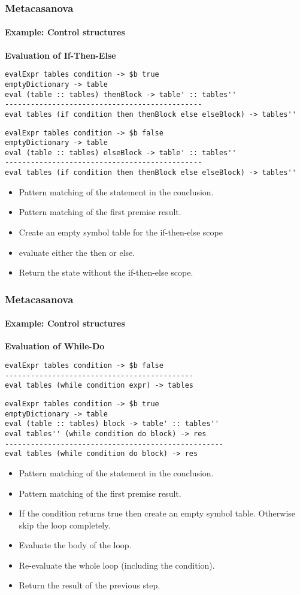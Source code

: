 \documentclass[10pt,a4paper]{beamer}
\begin{document}
\begin{frame}[fragile]
\frametitle{Metacasanova}
\framesubtitle{Example: Control structures}
\textbf{Evaluation of If-Then-Else}
\begin{lstlisting}
evalExpr tables condition -> $b true
emptyDictionary -> table
eval (table :: tables) thenBlock -> table' :: tables''
----------------------------------------------
eval tables (if condition then thenBlock else elseBlock) -> tables''
\end{lstlisting}

\begin{lstlisting}
evalExpr tables condition -> $b false
emptyDictionary -> table
eval (table :: tables) elseBlock -> table' :: tables''
----------------------------------------------
eval tables (if condition then thenBlock else elseBlock) -> tables''
\end{lstlisting}

\begin{itemize}
	\item Pattern matching of the statement in the conclusion.
	\item Pattern matching of the first premise result.
	\item Create an empty symbol table for the if-then-else scope
	\item evaluate either the then or else. 
	\item Return the state without the if-then-else scope.
\end{itemize}
\end{frame}

\begin{frame}[fragile]
\frametitle{Metacasanova}
\framesubtitle{Example: Control structures}
\textbf{Evaluation of While-Do}
\begin{lstlisting}
evalExpr tables condition -> $b false
--------------------------------------------
eval tables (while condition expr) -> tables
\end{lstlisting}

\begin{lstlisting}
evalExpr tables condition -> $b true
emptyDictionary -> table
eval (table :: tables) block -> table' :: tables''
eval tables'' (while condition do block) -> res
---------------------------------------------------
eval tables (while condition do block) -> res
\end{lstlisting}

\begin{itemize}
	\item Pattern matching of the statement in the conclusion.
	\item Pattern matching of the first premise result.
	\item If the condition returns true then create an empty symbol table. Otherwise skip the loop completely.
	\item Evaluate the body of the loop.
	\item Re-evaluate the whole loop (including the condition).
	\item Return the result of the previous step.
\end{itemize}
\end{frame}
\end{document}
